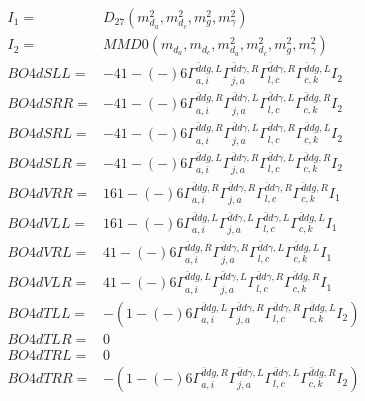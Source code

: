 \documentclass[A4,landscape]{article}
\begin{document}
\begin{align} 
I_1 = & D_{27}(m^2_{d_{{a}}}, m^2_{d_{{c}}}, m^2_{g}, m^2_{\gamma}) \\ 
I_2 = & MMD0(m_{d_{{a}}}, m_{d_{{c}}}, m^2_{d_{{a}}}, m^2_{d_{{c}}}, m^2_{g}, m^2_{\gamma}) \\ 
  BO4dSLL= & -4   1
-(-)
  6 \Gamma^{\bar{d}d g ,L}_{a, i} \Gamma^{\bar{d}d \gamma ,R}_{j, a} \Gamma^{\bar{d}d \gamma ,R}_{l, c} \Gamma^{\bar{d}d g ,L}_{c, k} I_2 \\ 
  BO4dSRR= & -4   1
-(-)
  6 \Gamma^{\bar{d}d g ,R}_{a, i} \Gamma^{\bar{d}d \gamma ,L}_{j, a} \Gamma^{\bar{d}d \gamma ,L}_{l, c} \Gamma^{\bar{d}d g ,R}_{c, k} I_2 \\ 
  BO4dSRL= & -4   1
-(-)
  6 \Gamma^{\bar{d}d g ,R}_{a, i} \Gamma^{\bar{d}d \gamma ,L}_{j, a} \Gamma^{\bar{d}d \gamma ,R}_{l, c} \Gamma^{\bar{d}d g ,L}_{c, k} I_2 \\ 
  BO4dSLR= & -4   1
-(-)
  6 \Gamma^{\bar{d}d g ,L}_{a, i} \Gamma^{\bar{d}d \gamma ,R}_{j, a} \Gamma^{\bar{d}d \gamma ,L}_{l, c} \Gamma^{\bar{d}d g ,R}_{c, k} I_2 \\ 
  BO4dVRR= & 16   1
-(-)
  6 \Gamma^{\bar{d}d g ,R}_{a, i} \Gamma^{\bar{d}d \gamma ,R}_{j, a} \Gamma^{\bar{d}d \gamma ,R}_{l, c} \Gamma^{\bar{d}d g ,R}_{c, k} I_1 \\ 
  BO4dVLL= & 16   1
-(-)
  6 \Gamma^{\bar{d}d g ,L}_{a, i} \Gamma^{\bar{d}d \gamma ,L}_{j, a} \Gamma^{\bar{d}d \gamma ,L}_{l, c} \Gamma^{\bar{d}d g ,L}_{c, k} I_1 \\ 
  BO4dVRL= & 4   1
-(-)
  6 \Gamma^{\bar{d}d g ,R}_{a, i} \Gamma^{\bar{d}d \gamma ,R}_{j, a} \Gamma^{\bar{d}d \gamma ,L}_{l, c} \Gamma^{\bar{d}d g ,L}_{c, k} I_1 \\ 
  BO4dVLR= & 4   1
-(-)
  6 \Gamma^{\bar{d}d g ,L}_{a, i} \Gamma^{\bar{d}d \gamma ,L}_{j, a} \Gamma^{\bar{d}d \gamma ,R}_{l, c} \Gamma^{\bar{d}d g ,R}_{c, k} I_1 \\ 
  BO4dTLL= & -(  1
-(-)
  6 \Gamma^{\bar{d}d g ,L}_{a, i} \Gamma^{\bar{d}d \gamma ,R}_{j, a} \Gamma^{\bar{d}d \gamma ,R}_{l, c} \Gamma^{\bar{d}d g ,L}_{c, k} I_2) \\ 
  BO4dTLR= & 0 \\ 
  BO4dTRL= & 0 \\ 
  BO4dTRR= & -(  1
-(-)
  6 \Gamma^{\bar{d}d g ,R}_{a, i} \Gamma^{\bar{d}d \gamma ,L}_{j, a} \Gamma^{\bar{d}d \gamma ,L}_{l, c} \Gamma^{\bar{d}d g ,R}_{c, k} I_2) \\ 
\end{align} 
\end{document}
